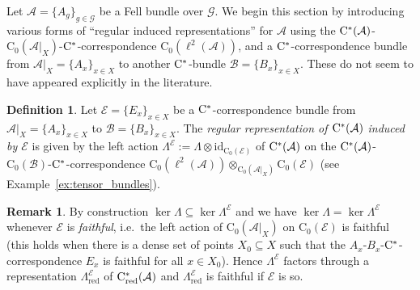 \documentclass[11 pt, leqno]{amsart}
\numberwithin{equation}{section}
\theoremstyle{plain}
\theoremstyle{definition}
\newtheorem {defn}[thm] {Definition}
\newtheorem {rem} [thm]{Remark}
\newcommand*{\contz}{\mathrm{C_0}}%
\DeclareMathOperator{\red}{red}%
\newcommand{\B}{\mathcal B}
\newcommand{\G}{\mathcal G} %
\newcommand{\EE}{\mathcal E}
\newcommand{\A}{\mathcal A}
\newcommand{\cst}{\ifmmode\mathrm{C}^*\else{$\mathrm{C}^*$}\fi}
\begin{document}
Let $\A=\{A_g\}_{g\in \G}$ be a Fell bundle over $\G$. 
We begin this section by introducing various forms of ``regular induced representations'' for $\A$ using the $\cst(\A)$-$\contz(\A|_X)$-$\cst$-correspondence $\contz(\ell^2(\A))$, and a $\cst$-correspondence bundle from $\A|_X=\{A_x\}_{x\in X}$ to another $\cst$-bundle $\B=\{B_x\}_{x\in X}$. 
These do not seem to have appeared explicitly in the literature. 

\begin{defn}\label{def:regular induced rep}
Let $\EE=\{E_x\}_{x\in X}$ be a $\cst$-correspondence bundle from $\A|_X=\{A_x\}_{x\in X}$ to $\B=\{B_x\}_{x\in X}$. 
The \emph{regular representation of $\cst(\A)$ induced by $\EE$} is given by the left action $\Lambda^{\EE} := \Lambda\otimes \mathrm{id}_{\contz(\EE)}$ of $\cst(\A)$ on the $\cst(\A)$-$\contz(\B)$-$\cst$-correspondence $\contz(\ell^2(\A)) \otimes_{\contz(\A|_X)} \contz(\EE)$ (see Example~\ref{ex:tensor_bundles}).
\end{defn}

\begin{rem} 
By construction $\ker \Lambda \subseteq \ker \Lambda^{\EE}$ and we have  $\ker\Lambda = \ker\Lambda^{\EE}$ whenever $\EE$ is \emph{faithful}, i.e.\ the left action of $\contz(\A|_X)$ on $\contz(\EE)$ is faithful (this holds when there is a dense set of points $X_0\subseteq X$ such that the $A_x$-$B_x$-$\cst$-correspondence $E_x$ is faithful for all $x \in X_0$). 
Hence $\Lambda^{\EE}$ factors through a representation $\Lambda^{\EE}_{\red}$ of  $\cst_{\red}(\A)$ and $\Lambda^{\EE}_{\red}$ is faithful if $\EE$ is so.
\end{rem}
\end{document}

